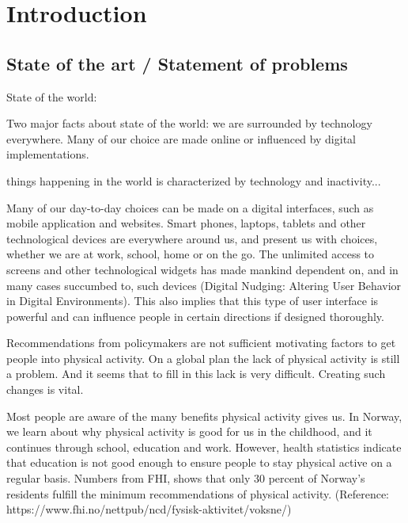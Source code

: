\chapter{Introduction} 


\section{State of the art / Statement of problems}
State of the world: 

Two major facts about state of the world: we are surrounded by technology everywhere. Many of our choice are made online or influenced by digital implementations. 

things happening in the world is characterized by technology and inactivity... 

Many of our day-to-day choices can be made on a digital interfaces, such as mobile application and websites. Smart phones, laptops, tablets and other technological devices are everywhere around us, and present us with choices, whether we are at work, school, home or on the go. The unlimited access to screens and other technological widgets has made mankind dependent on, and in many cases succumbed to, such devices (Digital Nudging: Altering User Behavior in Digital Environments). This also implies that this type of user interface is powerful and can influence people in certain directions if designed thoroughly.  



Recommendations from policymakers are not sufficient motivating factors to get people into physical activity. On a global plan the lack of physical activity is still a problem. And it seems that to fill in this lack is very difficult. Creating such changes is vital. 

Most people are aware of the many benefits physical activity gives us. In Norway, we learn about why physical activity is good for us in the childhood, and it continues through school, education and work. However, health statistics indicate that education is not good enough to ensure people to stay physical active on a regular basis. Numbers from FHI, shows that only 30 percent of Norway's residents fulfill the minimum recommendations of physical activity. (Reference: https://www.fhi.no/nettpub/ncd/fysisk-aktivitet/voksne/) 

